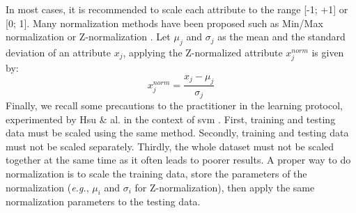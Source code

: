 In most cases, it is recommended to scale each attribute to the range [-1; +1] or [0; 1]. Many normalization methods have been proposed such as Min/Max normalization or Z-normalization \cite{Mohamad2013}. Let $\mu_j$ and $\sigma_j$ as the mean and the standard deviation of an attribute $x_j$, applying the Z-normalized attribute $x^{norm}_j$ is given by:
\begin{equation}
x^{norm}_j = \frac{x_j-\mu_j}{\sigma_j}
\end{equation}
%
%
Finally, we recall some precautions to the practitioner in the learning protocol, experimented by Hsu \& al. in the context of {\sc svm} \cite{Hsu2008}. First, training and testing data must be scaled using the same method. Secondly, training and testing data must not be scaled separately. Thirdly, the whole dataset must not be scaled together at the same time as it often leads to poorer results. A proper way to do normalization is to scale the training data, store the parameters of the normalization (\textit{e.g.}, $\mu_i$ and $\sigma_i$ for Z-normalization), then apply the same normalization parameters to the testing data. 


